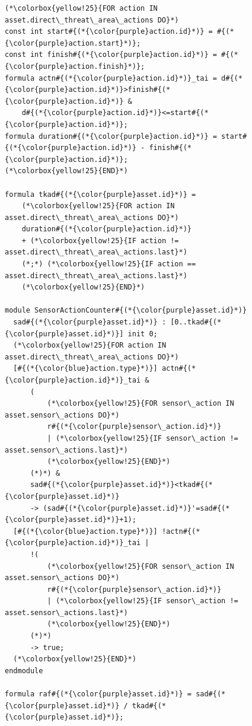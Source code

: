 \begin{figure}[!ht]
\begin{lstlisting}[caption={DTMC template for risk acceptability},label=lst:DTMC_risk_acceptability_template]
(*\colorbox{yellow!25}{FOR action IN asset.direct\_threat\_area\_actions DO}*)
const int start#{(*{\color{purple}action.id}*)} = #{(*{\color{purple}action.start}*)};
const int finish#{(*{\color{purple}action.id}*)} = #{(*{\color{purple}action.finish}*)};
formula actn#{(*{\color{purple}action.id}*)}_tai = d#{(*{\color{purple}action.id}*)}>finish#{(*{\color{purple}action.id}*)} &
    d#{(*{\color{purple}action.id}*)}<=start#{(*{\color{purple}action.id}*)};
formula duration#{(*{\color{purple}action.id}*)} = start#{(*{\color{purple}action.id}*)} - finish#{(*{\color{purple}action.id}*)};
(*\colorbox{yellow!25}{END}*)

formula tkad#{(*{\color{purple}asset.id}*)} =
    (*\colorbox{yellow!25}{FOR action IN asset.direct\_threat\_area\_actions DO}*)
    duration#{(*{\color{purple}action.id}*)}
    + (*\colorbox{yellow!25}{IF action != asset.direct\_threat\_area\_actions.last}*)
    (*;*) (*\colorbox{yellow!25}{IF action == asset.direct\_threat\_area\_actions.last}*)
    (*\colorbox{yellow!25}{END}*)

module SensorActionCounter#{(*{\color{purple}asset.id}*)}
  sad#{(*{\color{purple}asset.id}*)} : [0..tkad#{(*{\color{purple}asset.id}*)}] init 0;
  (*\colorbox{yellow!25}{FOR action IN asset.direct\_threat\_area\_actions DO}*)
  [#{(*{\color{blue}action.type}*)}] actn#{(*{\color{purple}action.id}*)}_tai &
      (
          (*\colorbox{yellow!25}{FOR sensor\_action IN asset.sensor\_actions DO}*)
          r#{(*{\color{purple}sensor\_action.id}*)}
          | (*\colorbox{yellow!25}{IF sensor\_action != asset.sensor\_actions.last}*)
          (*\colorbox{yellow!25}{END}*)
      (*)*) &
      sad#{(*{\color{purple}asset.id}*)}<tkad#{(*{\color{purple}asset.id}*)}
      -> (sad#{(*{\color{purple}asset.id}*)}'=sad#{(*{\color{purple}asset.id}*)}+1);
  [#{(*{\color{blue}action.type}*)}] !actn#{(*{\color{purple}action.id}*)}_tai |
      !(
          (*\colorbox{yellow!25}{FOR sensor\_action IN asset.sensor\_actions DO}*)
          r#{(*{\color{purple}sensor\_action.id}*)}
          | (*\colorbox{yellow!25}{IF sensor\_action != asset.sensor\_actions.last}*)
          (*\colorbox{yellow!25}{END}*)
      (*)*)
      -> true;
  (*\colorbox{yellow!25}{END}*)
endmodule

formula raf#{(*{\color{purple}asset.id}*)} = sad#{(*{\color{purple}asset.id}*)} / tkad#{(*{\color{purple}asset.id}*)};
\end{lstlisting}
\end{figure}

